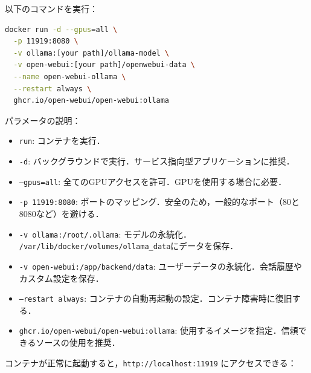 以下のコマンドを実行：
\begin{lstlisting}[language=bash]
docker run -d --gpus=all \
  -p 11919:8080 \
  -v ollama:[your path]/ollama-model \
  -v open-webui:[your path]/openwebui-data \
  --name open-webui-ollama \
  --restart always \
  ghcr.io/open-webui/open-webui:ollama
\end{lstlisting}

パラメータの説明：
\begin{itemize}
  \item \texttt{run}: コンテナを実行．
  
  \item \texttt{-d}: バックグラウンドで実行．サービス指向型アプリケーションに推奨．
  
  \item \texttt{--gpus=all}: 全てのGPUアクセスを許可．GPUを使用する場合に必要．
  
  \item \texttt{-p 11919:8080}: ポートのマッピング．安全のため，一般的なポート（80と8080など）を避ける．
  
  \item \texttt{-v ollama:/root/.ollama}: モデルの永続化．\\ \texttt{/var/lib/docker/volumes/ollama\_data}にデータを保存．
  
  \item \texttt{-v open-webui:/app/backend/data}: ユーザーデータの永続化．会話履歴やカスタム設定を保存．
  
  \item \texttt{--restart always}: コンテナの自動再起動の設定．コンテナ障害時に復旧する．
  
  \item \texttt{ghcr.io/open-webui/open-webui:ollama}: 使用するイメージを指定．信頼できるソースの使用を推奨．
\end{itemize}

コンテナが正常に起動すると，\texttt{http://localhost:11919} にアクセスできる：


